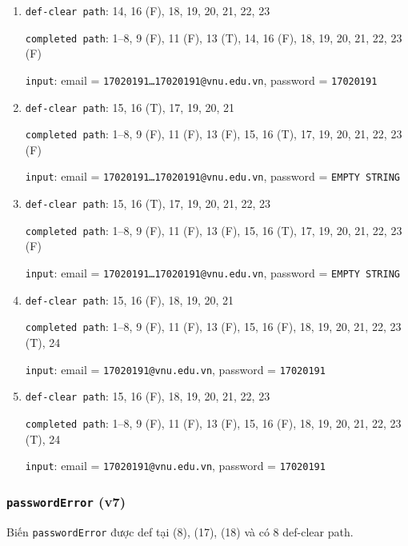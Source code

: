 \documentclass{article}
\begin{document}
\begin{enumerate}
    \item \texttt{def-clear path}: 14, 16 (F), 18, 19, 20, 21, 22, 23
          \par \texttt{completed path}: 1--8, 9 (F), 11 (F), 13 (T), 14, 16 (F), 18, 19, 20, 21, 22, 23 (F)
          \par \texttt{input}: email = \texttt{17020191\ldots17020191@vnu.edu.vn}, password = \texttt{17020191}

    \item \texttt{def-clear path}: 15, 16 (T), 17, 19, 20, 21
          \par \texttt{completed path}: 1--8, 9 (F), 11 (F), 13 (F), 15, 16 (T), 17, 19, 20, 21, 22, 23 (F)
          \par \texttt{input}: email = \texttt{17020191\ldots17020191@vnu.edu.vn}, password = \texttt{EMPTY STRING}

    \item \texttt{def-clear path}: 15, 16 (T), 17, 19, 20, 21, 22, 23
          \par \texttt{completed path}: 1--8, 9 (F), 11 (F), 13 (F), 15, 16 (T), 17, 19, 20, 21, 22, 23 (F)
          \par \texttt{input}: email = \texttt{17020191\ldots17020191@vnu.edu.vn}, password = \texttt{EMPTY STRING}

    \item \texttt{def-clear path}: 15, 16 (F), 18, 19, 20, 21
          \par \texttt{completed path}: 1--8, 9 (F), 11 (F), 13 (F), 15, 16 (F), 18, 19, 20, 21, 22, 23 (T), 24
          \par \texttt{input}: email = \texttt{17020191@vnu.edu.vn}, password = \texttt{17020191}

    \item \texttt{def-clear path}: 15, 16 (F), 18, 19, 20, 21, 22, 23
          \par \texttt{completed path}: 1--8, 9 (F), 11 (F), 13 (F), 15, 16 (F), 18, 19, 20, 21, 22, 23 (T), 24
          \par \texttt{input}: email = \texttt{17020191@vnu.edu.vn}, password = \texttt{17020191}

\end{enumerate}

\subsubsection*{\texttt{passwordError} (v7)}

\par Biến \texttt{passwordError} được def tại (8), (17), (18) và có 8 def-clear path.
\end{document}
